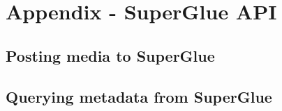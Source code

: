 \chapter{Appendix - SuperGlue API}
\label{appendix}

\section{Posting media to SuperGlue}

\section{Querying metadata from SuperGlue}